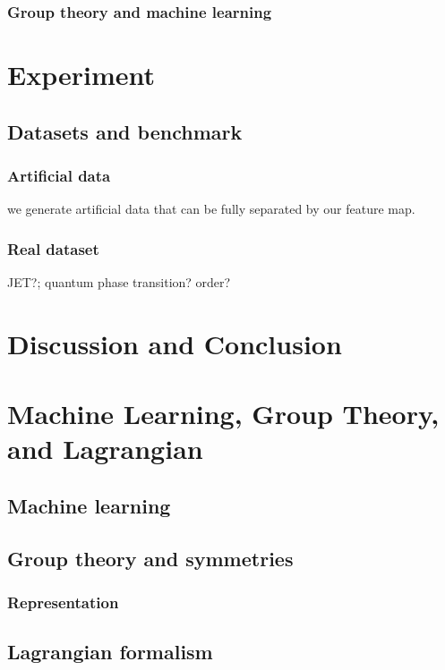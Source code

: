 \subsubsection{Group theory and machine learning}
\cite{kondorDiffusionKernelsGraphs2002}

\section{Experiment}\label{sec:experiments}

\subsection{Datasets and benchmark}
\subsubsection{Artificial data}
we generate artificial data that can be fully separated by our feature map.
\subsubsection{Real dataset}
JET?; quantum phase transition? order?

\section{Discussion and Conclusion}\label{sec:discussion}

\printbibliography
\appendix

\section{Machine Learning, Group Theory, and Lagrangian}
\subsection{Machine learning}

\subsection{Group theory and symmetries}
\subsubsection{Representation}

\subsection{Lagrangian formalism}\label{sec:lagrangian}
\cite{xuLagrangianFormalismQuantum2021}